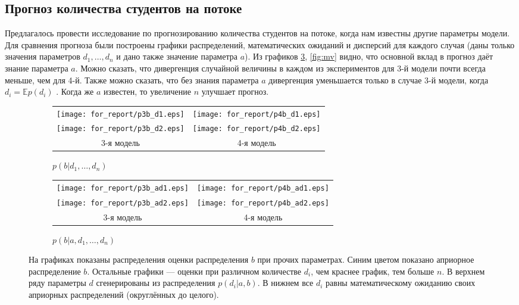 \documentclass[12pt,a4paper]{article}
\begin{document}
\subsection{Прогноз количества студентов на потоке}

Предлагалось провести исследование по прогнозированию количества студентов на потоке, когда нам известны другие параметры модели.
Для сравнения прогноза были построены графики распределений, математических ожиданий и дисперсий для каждого случая (даны только значения параметров $d_1, \dots, d_n$ и дано также значение параметра $a$).
Из графиков \ref{fig:pb_d}, \ref{fig:mv} видно, что основной вклад в прогноз даёт знание параметра $a$. Можно сказать, что дивергенция случайной величины в каждом из экспериментов для 3-й модели почти всегда меньше, чем для 4-й. Также можно сказать, что без знания параметра $a$ дивергенция уменьшается только в случае 3-й модели, когда $d_i = \mathbb{E}p(d_i)$ . Когда же $a$ известен, то увеличение $n$ улучшает прогноз.

\begin{figure}[p]
  \centering
  \begin{subfigure}[b]{0.48\textwidth}
    \centering
    \begin{tabular}{cc}
      \texttt{[image: for\_report/p3b\_d1.eps]} &
      \texttt{[image: for\_report/p4b\_d1.eps]} \\
      \texttt{[image: for\_report/p3b\_d2.eps]} &
      \texttt{[image: for\_report/p4b\_d2.eps]} \\
      3-я модель & 4-я модель
    \end{tabular}
    
    \label{fig:pb_d}
    \caption{$p(b | d_1, \dots, d_n)$}
  \end{subfigure}
  \begin{subfigure}[b]{0.48\textwidth}
    \centering
    \begin{tabular}{cc}
      \texttt{[image: for\_report/p3b\_ad1.eps]} &
      \texttt{[image: for\_report/p4b\_ad1.eps]} \\
      \texttt{[image: for\_report/p3b\_ad2.eps]} &
      \texttt{[image: for\_report/p4b\_ad2.eps]} \\
      3-я модель & 4-я модель
    \end{tabular}
    \label{fig:pb_ad}
    \caption{$p(b | a, d_1, \dots, d_n)$}
  \end{subfigure}
  \caption{На графиках показаны распределения оценки распределения $b$ при прочих параметрах. Синим цветом показано априорное распределение $b$. Остальные графики --- оценки при различном количестве $d_i$, чем краснее график, тем больше $n$. В верхнем ряду параметры $d$ сгенерированы из распределения $p(d_i | a, b)$. В нижнем все $d_i$ равны математическому ожиданию своих априорных распределений (округлённых до целого).}
  \label{fig:pb_d}
\end{figure}
\end{document}
